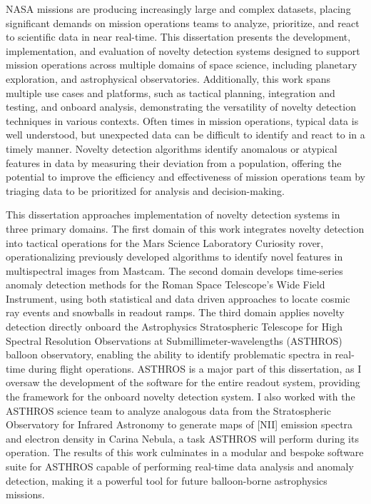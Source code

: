 NASA missions are producing increasingly large and complex datasets, placing significant demands on mission operations teams to analyze, prioritize, and react to scientific data in near real-time. 
This dissertation presents the development, implementation, and evaluation of novelty detection systems designed to support mission operations across multiple domains of space science, including planetary exploration, and astrophysical observatories. 
Additionally, this work spans multiple use cases and platforms, such as tactical planning, integration and testing, and onboard analysis, demonstrating the versatility of novelty detection techniques in various contexts.
Often times in mission operations, typical data is well understood, but unexpected data can be difficult to identify and react to in a timely manner.
Novelty detection algorithms identify anomalous or atypical features in data by measuring their deviation from a population, offering the potential to improve the efficiency and effectiveness of mission operations team by triaging data to be prioritized for analysis and decision-making.

This dissertation approaches implementation of novelty detection systems in three primary domains. 
The first domain of this work integrates novelty detection into tactical operations for the Mars Science Laboratory Curiosity rover, operationalizing previously developed algorithms to identify novel features in multispectral images from Mastcam.
The second domain develops time-series anomaly detection methods for the Roman Space Telescope's Wide Field Instrument, using both statistical and data driven approaches to locate cosmic ray events and snowballs in readout ramps. 
The third domain applies novelty detection directly onboard the Astrophysics Stratospheric Telescope for High Spectral Resolution Observations at Submillimeter-wavelengths (ASTHROS) balloon observatory, enabling the ability to identify problematic spectra in real-time during flight operations.
ASTHROS is a major part of this dissertation, as I oversaw the development of the software for the entire readout system, providing the framework for the onboard novelty detection system.
I also worked with the ASTHROS science team to analyze analogous data from the Stratospheric Observatory for Infrared Astronomy to generate maps of [NII] emission spectra and electron density in Carina Nebula, a task ASTHROS will perform during its operation.
The results of this work culminates in a modular and bespoke software suite for ASTHROS capable of performing real-time data analysis and anomaly detection, making it a powerful tool for future balloon-borne astrophysics missions.